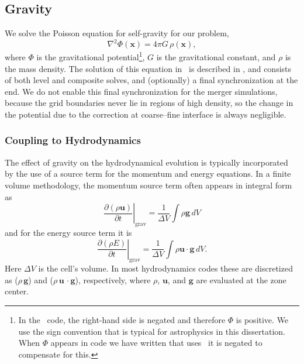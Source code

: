 \documentclass[12pt]{article}
\begin{document}
\subsection{Gravity}
\label{sec:gravity}

We solve the Poisson equation for self-gravity for our problem,
\begin{equation}
  \nabla^2 \Phi(\mathbf{x}) = 4\pi G\, \rho(\mathbf{x}),
\end{equation}
where $\Phi$ is the gravitational potential\footnote{In the \castro\ code, the 
right-hand side is negated and therefore $\Phi$ is positive. We use the 
sign convention that is typical for astrophysics in this dissertation. 
When $\Phi$ appears in code we have written that uses \castro\
it is negated to compensate for this.},
$G$ is the gravitational constant, and $\rho$ is the mass density.
The solution of this equation in \castro\ is described in \cite{castro}, and
consists of both level and composite solves, and (optionally) a final
synchronization at the end. We do not enable this final synchronization
for the merger simulations, because the grid boundaries never lie in
regions of high density, so the change in the potential due to the correction
at coarse--fine interface is always negligible.

\subsubsection{Coupling to Hydrodynamics}\label{sec:gravity_hydro_coupling}

The effect of gravity on the hydrodynamical evolution is typically
incorporated by the use of a source term for the momentum and energy
equations. In a finite volume methodology, the momentum source term 
often appears in integral form as
\begin{equation}
  \left.\frac{\partial (\rho \mathbf{u})}{\partial t}\right|_{\text{grav}} = \frac{1}{\Delta V} \int \rho \mathbf{g}\, dV
\end{equation}
and for the energy source term it is
\begin{equation}
  \left.\frac{\partial (\rho E)}{\partial t}\right|_{\text{grav}} = \frac{1}{\Delta V} \int \rho \mathbf{u}\cdot\mathbf{g}\, dV \label{eq:cell_center_gravity_source}.
\end{equation}
Here $\Delta V$ is the cell's volume.
In most hydrodynamics codes these are discretized as ($\rho\,
\mathbf{g}$) and ($\rho\, \mathbf{u}\,\cdot\mathbf{g}$), respectively, 
where $\rho$, $\mathbf{u}$, and $\mathbf{g}$ 
are evaluated at the zone center. 
\end{document}
